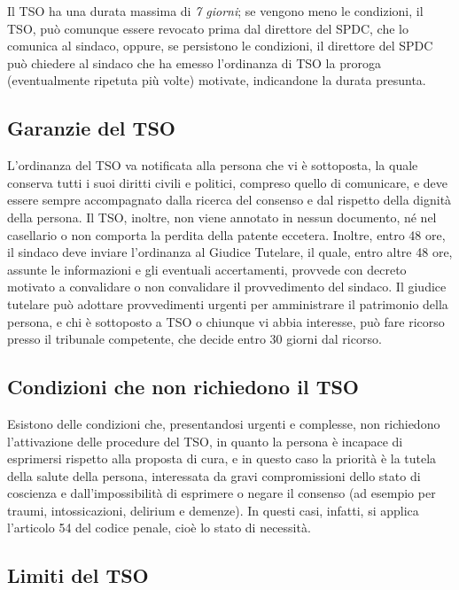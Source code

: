 Il TSO ha una durata massima di \emph{7 giorni}; se vengono meno le
condizioni, il TSO, può comunque essere revocato prima dal direttore del
SPDC, che lo comunica al sindaco, oppure, se persistono le condizioni,
il direttore del SPDC può chiedere al sindaco che ha emesso l'ordinanza
di TSO la proroga (eventualmente ripetuta più volte) motivate,
indicandone la durata presunta.

\subsection{Garanzie del TSO}

L'ordinanza del TSO va notificata alla persona che vi è sottoposta, la
quale conserva tutti i suoi diritti civili e politici, compreso quello
di comunicare, e deve essere sempre accompagnato dalla ricerca del
consenso e dal rispetto della dignità della persona. Il TSO, inoltre,
non viene annotato in nessun documento, né nel casellario o non comporta
la perdita della patente eccetera. Inoltre, entro 48 ore, il sindaco
deve inviare l'ordinanza al Giudice Tutelare, il quale, entro altre 48
ore, assunte le informazioni e gli eventuali accertamenti, provvede con
decreto motivato a convalidare o non convalidare il provvedimento del
sindaco. Il giudice tutelare può adottare provvedimenti urgenti per
amministrare il patrimonio della persona, e chi è sottoposto a TSO o
chiunque vi abbia interesse, può fare ricorso presso il tribunale
competente, che decide entro 30 giorni dal ricorso.

\subsection{Condizioni che non richiedono il TSO}

Esistono delle condizioni che, presentandosi urgenti e complesse, non
richiedono l'attivazione delle procedure del TSO, in quanto la persona è
incapace di esprimersi rispetto alla proposta di cura, e in questo caso
la priorità è la tutela della salute della persona, interessata da gravi
compromissioni dello stato di coscienza e dall'impossibilità di
esprimere o negare il consenso (ad esempio per traumi, intossicazioni,
delirium e demenze). In questi casi, infatti, si applica l'articolo 54
del codice penale, cioè lo stato di necessità.

\subsection{Limiti del TSO}

